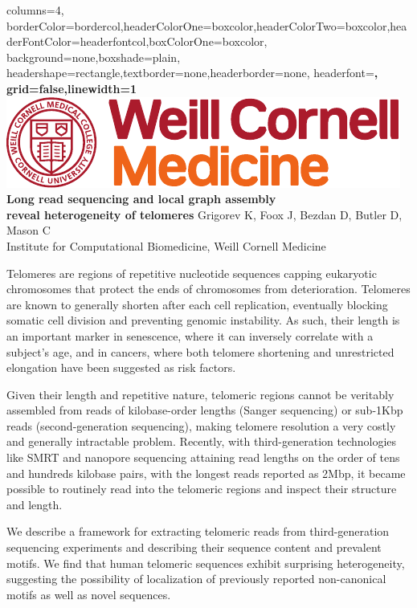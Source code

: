 \documentclass[paperwidth=42in,paperheight=47.75in,portrait]{baposter}
\begin{document}
\begin{poster}{
    columns=4,
    borderColor=bordercol,headerColorOne=boxcolor,headerColorTwo=boxcolor,headerFontColor=headerfontcol,boxColorOne=boxcolor,
    background=none,boxshade=plain,
    headershape=rectangle,textborder=none,headerborder=none,
    headerfont=\Large\sf\bf,
    grid=false,linewidth=1
}
{\includegraphics[scale=1.7]{logo.pdf}}{\sf\bf Long read sequencing and local graph assembly \\ reveal heterogeneity of telomeres} {
    \vspace{.4em} Grigorev K, Foox J, Bezdan D, Butler D, Mason C \\
    {\small Institute for Computational Biomedicine, Weill Cornell Medicine}
}


{\small
    Telomeres are regions of repetitive nucleotide sequences capping eukaryotic chromosomes that protect the ends of chromosomes from deterioration.
    Telomeres are known to generally shorten after each cell replication, eventually blocking somatic cell division and preventing genomic instability.
    As such, their length is an important marker in senescence, where it can inversely correlate with a subject’s age, and in cancers, where both
    telomere shortening and unrestricted elongation have been suggested as risk factors.

    Given their length and repetitive nature, telomeric regions cannot be veritably assembled from reads of kilobase-order lengths (Sanger sequencing)
    or sub-1Kbp reads (second-generation sequencing), making telomere resolution a very costly and generally intractable problem.
    Recently, with third-generation technologies like SMRT and nanopore sequencing attaining read lengths on the order of tens and hundreds kilobase
    pairs, with the longest reads reported as 2Mbp, it became possible to routinely read into the telomeric regions and inspect their structure
    and length.

    We describe a framework for extracting telomeric reads from third-generation sequencing experiments and describing their sequence content and
    prevalent motifs. We find that human telomeric sequences exhibit surprising heterogeneity, suggesting the possibility of localization of previously
    reported non-canonical motifs as well as novel sequences.

}
\end{poster}
\end{document}
